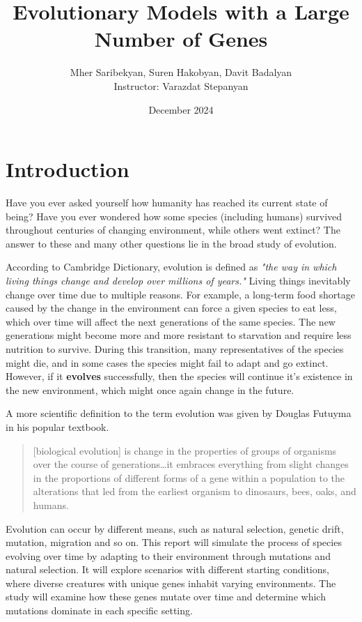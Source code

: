 \documentclass{article}
\title{Evolutionary Models with a Large Number of Genes}
\author{
    Mher Saribekyan, Suren Hakobyan, Davit Badalyan\\
    Instructor: Varazdat Stepanyan 
}
\affil{American University of Armenia}
\date{December 2024}
\begin{document}
\maketitle
\newpage
\tableofcontents
\newpage

\section{Introduction}
Have you ever asked yourself how humanity has reached its current state of being? Have you ever wondered how some species (including humans) survived throughout centuries of changing environment, while others went extinct? The answer to these and many other questions lie in the broad study of evolution. 

According to Cambridge Dictionary, evolution is defined as \textit{"the way in which living things change and develop over millions of years."} Living things inevitably change over time due to multiple reasons. For example, a long-term food shortage caused by the change in the environment can force a given species to eat less, which over time will affect the next generations of the same species. The new generations might become more and more resistant to starvation and require less nutrition to survive. During this transition, many representatives of the species might die, and in some cases the species might fail to adapt and go extinct. However, if it \textbf{evolves} successfully, then the species will continue it's existence in the new environment, which might once again change in the future. 

A more scientific definition to the term evolution was given by Douglas Futuyma in his popular textbook.

\begin{quotation}
    [biological evolution] is change in the properties of groups of organisms over the course of generations…it embraces everything from slight changes in the proportions of different forms of a gene within a population to the alterations that led from the earliest organism to dinosaurs, bees, oaks, and humans.
\end{quotation}

Evolution can occur by different means, such as natural selection, genetic drift, mutation, migration and so on. This report will simulate the process of species evolving over time by adapting to their environment through mutations and natural selection. It will explore scenarios with different starting conditions, where diverse creatures with unique genes inhabit varying environments. The study will examine how these genes mutate over time and determine which mutations dominate in each specific setting.
\newpage
\end{document}
